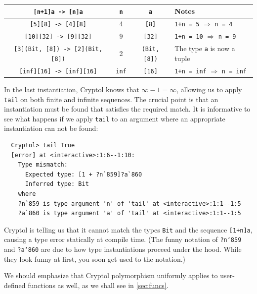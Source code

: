 
\begin{center}
\begin{tabular}[h]{c||c|c|l}
{\tt [n+1]a -> [n]a}                 & {\tt n}   & {\tt a}          & Notes \\ \hline\hline
{\tt [5][8] -> [4][8]}               &    4      & {\tt [8]}        & {\tt 1+n = 5} $\Rightarrow$ {\tt n = 4}  \\\hline
{\tt [10][32] -> [9][32]}            &    9      & {\tt [32]}       & {\tt 1+n = 10} $ \Rightarrow$ {\tt n = 9} \\\hline
{\tt [3](Bit, [8]) -> [2](Bit, [8])} &    2      & {\tt (Bit, [8])} & The type {\tt a} is now a tuple	           \\\hline
{\tt [inf][16] -> [inf][16]}         & {\tt inf} & {\tt [16]}       & {\tt 1+n = inf} $\Rightarrow$ {\tt n = inf}
\end{tabular}
\end{center}

In the last instantiation, Cryptol knows that $\infty - 1 = \infty$,
allowing us to apply {\tt tail} on both finite and infinite
sequences. The crucial point is that an instantiation must be found
that satisfies the required match.  It is informative to see what
happens if we apply {\tt tail} to an argument where an appropriate
instantiation can not be found:
\begin{Verbatim}
  Cryptol> tail True
  [error] at <interactive>:1:6--1:10:
    Type mismatch:
      Expected type: [1 + ?n`859]?a`860
      Inferred type: Bit
    where
    ?n`859 is type argument 'n' of 'tail' at <interactive>:1:1--1:5
    ?a`860 is type argument 'a' of 'tail' at <interactive>:1:1--1:5
\end{Verbatim}
Cryptol is telling us that it cannot match the types \texttt{Bit} and
the sequence \texttt{[1+n]a}, causing a type error statically at
compile time. (The funny notation of \texttt{?n`859} and
\texttt{?a`860} are due to how type instantiations proceed under the
hood. While they look funny at first, you soon get used to the
notation.)

We should emphasize that Cryptol polymorphism\indPolymorphism
uniformly applies to user-defined functions as well, as we shall see
in \autoref{sec:funcs}.


